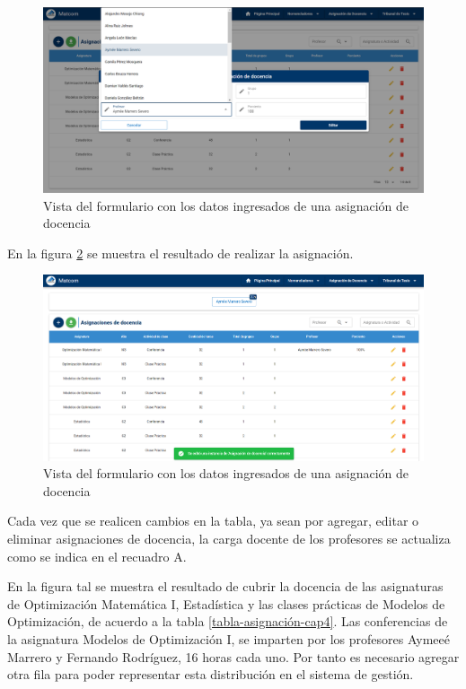 \begin{figure}[H]
    \includegraphics[scale=0.3]{Graphics/Implementation/Docencia/AD-form-fill.png}
    \caption{Vista del formulario con los datos ingresados de una asignación de docencia}
    \label{img-ta-form-fill}
\end{figure}


En la figura \ref{img-ta-one-assign} se muestra el resultado 
de realizar la asignación.


\begin{figure}[H]
    \includegraphics[scale=0.3]{Graphics/Implementation/Docencia/AD-one-assign.png}
    \caption{Vista del formulario con los datos ingresados de una asignación de docencia}
    \label{img-ta-one-assign}
\end{figure}

Cada vez que se realicen cambios en la tabla, ya sean por agregar, editar o eliminar 
asignaciones de docencia, la carga docente de los profesores se actualiza como se indica 
en el recuadro A. 

En la figura tal se muestra el resultado de cubrir la docencia de las asignaturas de Optimización
Matemática I, Estadística y las clases prácticas de Modelos de Optimización, de acuerdo a la tabla \ref{tabla-asignación-cap4}.
Las conferencias de la asignatura Modelos de Optimización I, se imparten por los profesores 
Aymeeé Marrero y Fernando Rodríguez, 16 horas cada uno. Por tanto es necesario agregar otra fila 
para poder representar esta distribución en el sistema de gestión. 









